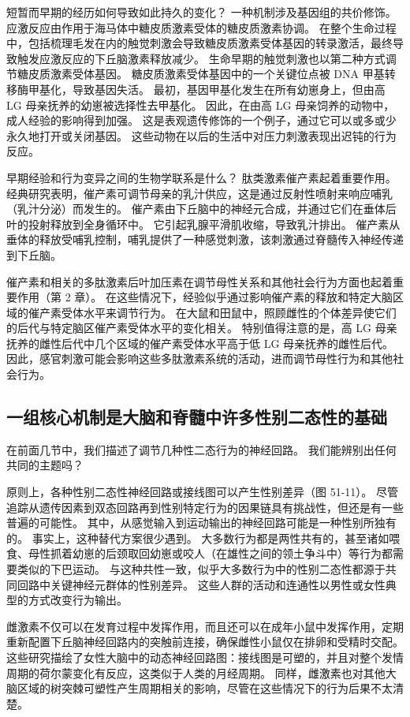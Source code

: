 短暂而早期的经历如何导致如此持久的变化？ 一种机制涉及基因组的共价修饰。 应激反应由作用于海马体中糖皮质激素受体的糖皮质激素协调。 在整个生命过程中，包括梳理毛发在内的触觉刺激会导致糖皮质激素受体基因的转录激活，最终导致触发应激反应的下丘脑激素释放减少。 生命早期的触觉刺激也以第二种方式调节糖皮质激素受体基因。 糖皮质激素受体基因中的一个关键位点被 DNA 甲基转移酶甲基化，导致基因失活。 最初，基因甲基化发生在所有幼崽身上，但由高 LG 母亲抚养的幼崽被选择性去甲基化。 因此，在由高 LG 母亲饲养的动物中，成人经验的影响得到加强。 这是表观遗传修饰的一个例子，通过它可以或多或少永久地打开或关闭基因。 这些动物在以后的生活中对压力刺激表现出迟钝的行为反应。

早期经验和行为变异之间的生物学联系是什么？ 肽类激素催产素起着重要作用。 经典研究表明，催产素可调节母亲的乳汁供应，这是通过反射性喷射来响应哺乳（乳汁分泌）而发生的。 催产素由下丘脑中的神经元合成，并通过它们在垂体后叶的投射释放到全身循环中。 它引起乳腺平滑肌收缩，导致乳汁排出。 催产素从垂体的释放受哺乳控制，哺乳提供了一种感觉刺激，该刺激通过脊髓传入神经传递到下丘脑。

催产素和相关的多肽激素后叶加压素在调节母性关系和其他社会行为方面也起着重要作用（第 2 章）。 在这些情况下，经验似乎通过影响催产素的释放和特定大脑区域的催产素受体水平来调节行为。 在大鼠和田鼠中，照顾雌性的个体差异使它们的后代与特定脑区催产素受体水平的变化相关。 特别值得注意的是，高 LG 母亲抚养的雌性后代中几个区域的催产素受体水平高于低 LG 母亲抚养的雌性后代。 因此，感官刺激可能会影响这些多肽激素系统的活动，进而调节母性行为和其他社会行为。

\subsection{一组核心机制是大脑和脊髓中许多性别二态性的基础}

在前面几节中，我们描述了调节几种性二态行为的神经回路。 我们能辨别出任何共同的主题吗？

原则上，各种性别二态性神经回路或接线图可以产生性别差异（图 51-11）。 尽管追踪从遗传因素到双态回路再到性别特定行为的因果链具有挑战性，但还是有一些普遍的可能性。 其中，从感觉输入到运动输出的神经回路可能是一种性别所独有的。 事实上，这种替代方案很少遇到。 大多数行为都是两性共有的，甚至诸如喂食、母性抓着幼崽的后颈取回幼崽或咬人（在雄性之间的领土争斗中）等行为都需要类似的下巴运动。 与这种共性一致，似乎大多数行为中的性别二态性都源于共同回路中关键神经元群体的性别差异。 这些人群的活动和连通性以男性或女性典型的方式改变行为输出。

雌激素不仅可以在发育过程中发挥作用，而且还可以在成年小鼠中发挥作用，定期重新配置下丘脑神经回路内的突触前连接，确保雌性小鼠仅在排卵和受精时交配。 这些研究描绘了女性大脑中的动态神经回路图：接线图是可塑的，并且对整个发情周期的荷尔蒙变化有反应，这类似于人类的月经周期。 同样，雌激素也对其他大脑区域的树突棘可塑性产生周期相关的影响，尽管在这些情况下的行为后果不太清楚。

